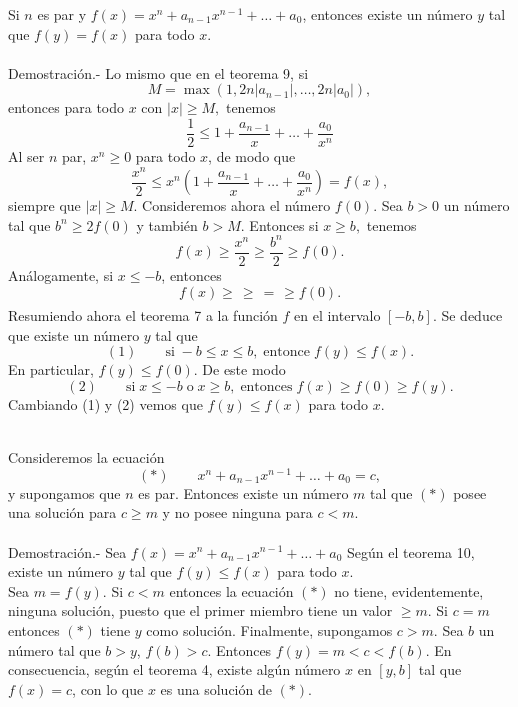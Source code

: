 \begin{teo}
    Si $n$ es par y $f(x)=x^n + a_{n-1} x^{n-1} + \ldots + a_0$, entonces existe un número $y$ tal que $f(y)=f(x)$ para todo $x$.\\\\
	Demostración.-\; Lo mismo que en el teorema 9, si 
	$$M = \max(1,2n|a_{n-1}|,\ldots , 2n|a_0|),$$
	entonces para todo $x$ con $|x|\geq M,$ tenemos
	$$\dfrac{1}{2}\leq 1 + \dfrac{a_{n-1}}{x}+\ldots + \dfrac{a_0}{x^n}$$
	Al ser $n$ par, $x^n \geq 0$ para todo $x$, de modo que 
	$$\dfrac{x^n}{2}\leq x^n \left(1+\dfrac{a_{n-1}}{x} + \ldots + \dfrac{a_0}{x^n}\right) = f(x),$$
	siempre que $|x|\geq M$. Consideremos ahora el número $f(0)$. Sea $b>0$ un número tal que $b^n \geq 2f(0)$ y también $b>M$. Entonces si $x\geq b,$ tenemos 
	$$f(x)\geq \dfrac{x^n}{2}\geq \dfrac{b^n}{2}\geq f(0).$$
	Análogamente, si $x\leq -b$, entonces
	$$f(x)\geq \dfrac{}{}\geq \dfrac{}{} = \dfrac{}{}\geq f(0).$$
	Resumiendo ahora el teorema 7 a la función $f$ en el intervalo $[-b,b]$. Se deduce que existe un número $y$ tal que
	$$(1)\qquad \mbox{si}\; -b\leq x\leq b, \; \mbox{entonce}\; f(y)\leq f(x).$$
	En particular, $f(y)\leq f(0).$ De este modo
	$$(2)\qquad \mbox{si}\; x\leq -b \; \mbox{o}\; x\geq b,\; \mbox{entonces}\; f(x)\geq f(0)\geq f(y).$$
	Cambiando (1) y (2) vemos que $f(y)\leq f(x)$ para todo $x$.\\\\
\end{teo}

\begin{teo}
    Consideremos la ecuación
    $$(*)\qquad x^n + a_{n-1}x^{n-1}+ \ldots + a_0 = c,$$
    y supongamos que $n$ es par. Entonces existe un número $m$ tal que $(*)$ posee una solución para $c\geq m$ y no posee ninguna para $c<m.$\\\\
    Demostración.-\; Sea $f(x) = x^n + a_{n-1}x^{n-1}+\ldots + a_0$
    Según el teorema 10, existe un número $y$ tal que $f(y)\leq f(x)$ para todo $x$.\\
    Sea $m=f(y)$. Si $c<m$ entonces la ecuación $(*)$ no tiene, evidentemente, ninguna solución, puesto que el primer miembro tiene un valor $\geq m$. Si $c=m$ entonces $(*)$ tiene $y$ como solución. Finalmente, supongamos $c>m$. Sea $b$ un número tal que $b>y$, $f(b)>c$. Entonces $f(y)=m<c<f(b)$. En consecuencia, según el teorema 4, existe algún número $x$ en $[y,b]$ tal que $f(x)=c$, con lo que $x$ es una solución de $(*).$\\\\
\end{teo}





